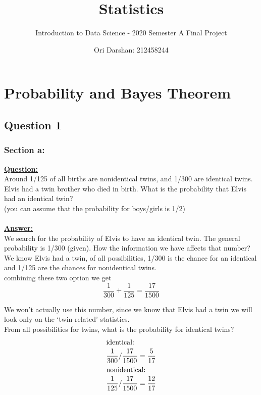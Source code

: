 \documentclass[a4, 12pt,titlepage]{scrartcl}
\title{Statistics}
\subtitle{Introduction to Data Science - 2020 Semester A Final Project}
\author{Ori Darshan: 212458244}
\date{}
\begin{document}
\maketitle

\bigskip
\section{Probability and Bayes Theorem}
\subsection{Question 1}
\subsubsection{Section a:}
\textbf{\underline{Question:}}\\
Around 1/125 of all births are nonidentical twins, and 1/300 are identical twins. Elvis had a twin brother who died in birth. What is the probability that Elvis had an identical twin?\\
(you can assume that the probability for boys/girls is 1/2)\\\smallskip\\
\textbf{\underline{Answer:}}\\
We search for the probability of Elvis to have an identical twin.
The general probability is 1/300 (given). How the information we have affects that number?\\
We know Elvis had a twin, of all possibilities, 1/300 is the chance for an identical and 1/125 are the chances for nonidentical twins.\\
combining these two option we get\[
\frac{1}{300}+\frac{1}{125}=\frac{17}{1500}
\]

We won't actually use this number, since we know that Elvis had a twin we will look only on the `twin related' statistics.\\
From all possibilities for twins, what is the probability for identical twins?
\begin{align*}
\intertext{identical:}
\frac{1}{300}/\frac{17}{1500}&=\frac{5}{17}\\
\intertext{nonidentical:}
\frac{1}{125}/\frac{17}{1500}&=\frac{12}{17}\\
\end{align*}
\end{document}
